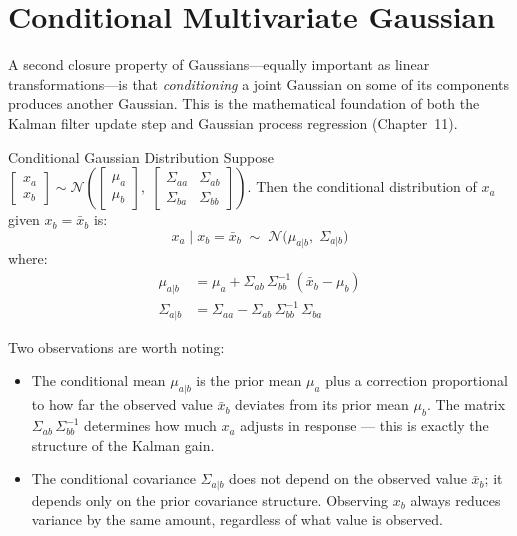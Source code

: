 \section{Conditional Multivariate Gaussian}
\label{sec:app_cond_gauss}

A second closure property of Gaussians---equally important as linear transformations---is that \emph{conditioning} a joint Gaussian on some of its components produces another Gaussian. This is the mathematical foundation of both the Kalman filter update step and Gaussian process regression (Chapter~11).

\begin{defnbox}{Conditional Gaussian Distribution}
Suppose $\begin{bmatrix} x_a \\ x_b \end{bmatrix} \sim \mathcal{N}\!\left(\begin{bmatrix} \mu_a \\ \mu_b \end{bmatrix},\; \begin{bmatrix} \Sigma_{aa} & \Sigma_{ab} \\ \Sigma_{ba} & \Sigma_{bb} \end{bmatrix}\right)$.
Then the conditional distribution of $x_a$ given $x_b = \bar{x}_b$ is:
\[
	x_a \mid x_b = \bar{x}_b \;\sim\; \mathcal{N}\!\bigl(\mu_{a|b},\; \Sigma_{a|b}\bigr)
\]
where:
\begin{align*}
	\mu_{a|b} &= \mu_a + \Sigma_{ab}\,\Sigma_{bb}^{-1}\,(\bar{x}_b - \mu_b) \\
	\Sigma_{a|b} &= \Sigma_{aa} - \Sigma_{ab}\,\Sigma_{bb}^{-1}\,\Sigma_{ba}
\end{align*}
\end{defnbox}

Two observations are worth noting:
\begin{itemize}[noitemsep]
	\item The conditional mean $\mu_{a|b}$ is the prior mean $\mu_a$ plus a correction proportional to how far the observed value $\bar{x}_b$ deviates from its prior mean $\mu_b$. The matrix $\Sigma_{ab}\,\Sigma_{bb}^{-1}$ determines how much $x_a$ adjusts in response --- this is exactly the structure of the Kalman gain.
	\item The conditional covariance $\Sigma_{a|b}$ does not depend on the observed value $\bar{x}_b$; it depends only on the prior covariance structure. Observing $x_b$ always reduces variance by the same amount, regardless of what value is observed.
\end{itemize}

